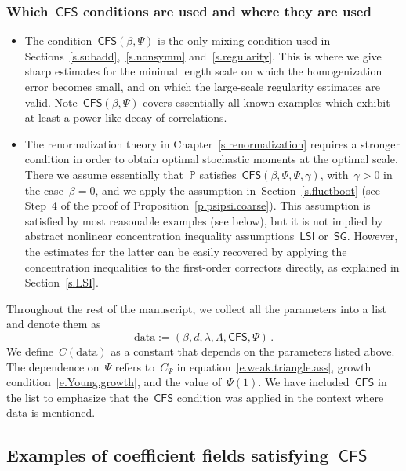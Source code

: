 \documentclass[11pt,twoside]{article} %
\numberwithin{equation}{section}
\theoremstyle{definition}
\renewcommand{\P}{\mathbb{P}}
\newcommand{\data}{\mathrm{data}}
\newcommand{\CFS}{\mathsf{CFS}}
\newcommand{\LSI}{\mathsf{LSI}}
\newcommand{\SG}{\mathsf{SG}}
\begin{document}
\subsubsection{Which~$\CFS$ conditions are used and where they are used}

\begin{itemize}
\item The condition~$\CFS(\beta,\Psi)$ is the only mixing condition used in Sections~\ref{s.subadd},~\ref{s.nonsymm} and~\ref{s.regularity}. 
This is where we give sharp estimates for the minimal length scale on which the  homogenization error becomes small, and on which the large-scale regularity estimates are valid. Note~$\CFS(\beta,\Psi)$ covers essentially all known examples which exhibit at least a power-like decay of correlations.  

\item The renormalization theory in Chapter~\ref{s.renormalization} requires a stronger condition in order to obtain optimal stochastic moments at the optimal scale. There we assume essentially that~$\P$ satisfies~$\CFS(\beta,\Psi,\Psi,\gamma)$, with~$\gamma>0$ in the case~$\beta=0$, and we apply the assumption in~Section~\ref{s.fluctboot} (see Step~4 of the proof of Proposition~\ref{p.psipsi.coarse}). This assumption is satisfied by most reasonable examples (see below), but it is not implied by abstract nonlinear concentration inequality assumptions~$\LSI$ or~$\SG$. However, the estimates for the latter can be easily recovered by applying the concentration inequalities to the first-order correctors directly, as explained in Section~\ref{s.LSI}. 
\end{itemize}

Throughout the rest of the manuscript, we collect all the parameters into a list and denote them as
\begin{equation} 
\label{e.data.def}
\data := (\beta,d,\lambda,\Lambda,\CFS,\Psi) \,.
\end{equation}
We define~$C(\data)$ as a constant that depends on the parameters listed above. The dependence on~$\Psi$ refers to~$C_{\Psi}$ in equation~\eqref{e.weak.triangle.ass}, growth condition~\eqref{e.Young.growth}, and the value of~$\Psi(1)$. We have included~$\CFS$ in the list to emphasize that the~$\CFS$ condition was applied in the context where~$\data$ is mentioned.


\subsection{Examples of coefficient fields satisfying~\texorpdfstring{$\CFS$}{{CFS}}}
\end{document}

